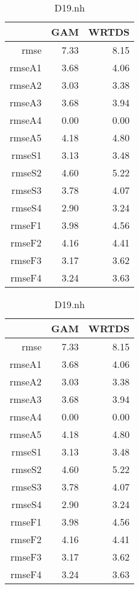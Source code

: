 \documentclass[12pt]{amsart}
\begin{document}
\begin{table}[H]
\centering
\begin{tabular}{rrr}
  \hline
 & GAM & WRTDS \\ 
  \hline
rmse & 7.33 & 8.15 \\ 
  rmseA1 & 3.68 & 4.06 \\ 
  rmseA2 & 3.03 & 3.38 \\ 
  rmseA3 & 3.68 & 3.94 \\ 
  rmseA4 & 0.00 & 0.00 \\ 
  rmseA5 & 4.18 & 4.80 \\ 
  rmseS1 & 3.13 & 3.48 \\ 
  rmseS2 & 4.60 & 5.22 \\ 
  rmseS3 & 3.78 & 4.07 \\ 
  rmseS4 & 2.90 & 3.24 \\ 
  rmseF1 & 3.98 & 4.56 \\ 
  rmseF2 & 4.16 & 4.41 \\ 
  rmseF3 & 3.17 & 3.62 \\ 
  rmseF4 & 3.24 & 3.63 \\ 
   \hline
\end{tabular}
\caption{D19.nh}
\end{table}

\begin{table}[H]
\centering
\begin{tabular}{rrr}
  \hline
 & GAM & WRTDS \\ 
  \hline
rmse & 7.33 & 8.15 \\ 
  rmseA1 & 3.68 & 4.06 \\ 
  rmseA2 & 3.03 & 3.38 \\ 
  rmseA3 & 3.68 & 3.94 \\ 
  rmseA4 & 0.00 & 0.00 \\ 
  rmseA5 & 4.18 & 4.80 \\ 
  rmseS1 & 3.13 & 3.48 \\ 
  rmseS2 & 4.60 & 5.22 \\ 
  rmseS3 & 3.78 & 4.07 \\ 
  rmseS4 & 2.90 & 3.24 \\ 
  rmseF1 & 3.98 & 4.56 \\ 
  rmseF2 & 4.16 & 4.41 \\ 
  rmseF3 & 3.17 & 3.62 \\ 
  rmseF4 & 3.24 & 3.63 \\ 
   \hline
\end{tabular}
\caption{D19.nh}
\end{table}
\end{document}

